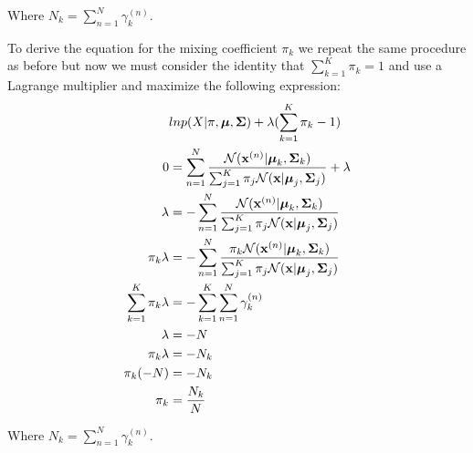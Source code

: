 \documentclass[12pt]{article}
\newcommand{\bmu}{{\boldsymbol{\mu}}}
\newcommand{\bSigma}{{\boldsymbol{\Sigma}}}
\newcommand{\bx}{{\bf{x}}}
\begin{document}
Where $N_k=\sum_{n=1}^N \gamma_k^{(n)}$.

To derive the equation for the mixing coefficient $\pi_k$ we repeat the same procedure as before but now we must consider the identity that $\sum_{k=1}^K\pi_k=1$ and use a Lagrange multiplier and maximize the following expression:
\begin{equation}\label{derSig}
\begin{split}
&lnp(X|\pi,\bmu,\bSigma)+\lambda(\sum_{k=1}^K\pi_k-1)\\
0&=\sum_{n=1}^N \frac{{\cal{N}}(\bx^{(n)} | \bmu_k, \bSigma_k)}{\sum_{j=1}^K \pi_j {\cal{N}}(\bx | \bmu_j, \bSigma_j)} +\lambda \\
\lambda&=-\sum_{n=1}^N \frac{{\cal{N}}(\bx^{(n)} | \bmu_k, \bSigma_k)}{\sum_{j=1}^K \pi_j {\cal{N}}(\bx | \bmu_j, \bSigma_j)} \\
\pi_k\lambda&=-\sum_{n=1}^N \frac{\pi_k{\cal{N}}(\bx^{(n)} | \bmu_k, \bSigma_k)}{\sum_{j=1}^K \pi_j {\cal{N}}(\bx | \bmu_j, \bSigma_j)} \\
\sum_{k=1}^K\pi_k\lambda&=-\sum_{k=1}^K\sum_{n=1}^N \gamma_k^{(n)} \\
\lambda &= -N \\
\pi_k\lambda&=-N_k \\
\pi_k(-N)&=-N_k \\
\pi_k&=\frac{N_k}{N} \\
\end{split}
\end{equation}

Where $N_k=\sum_{n=1}^N \gamma_k^{(n)}$. 

\newpage
\end{document}
